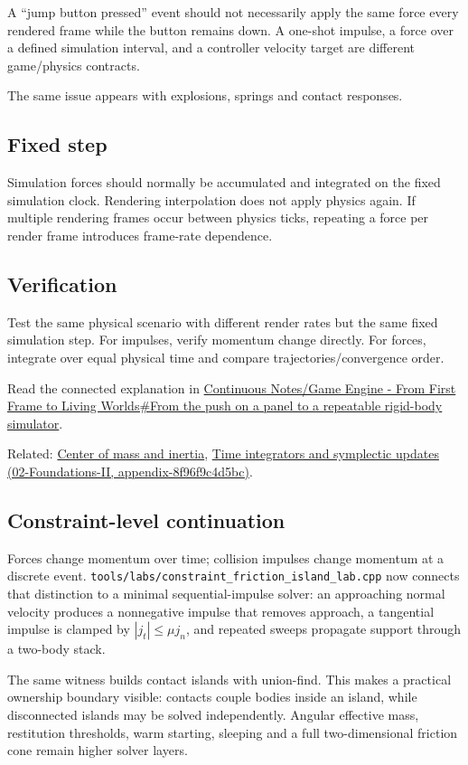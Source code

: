 A ``jump button pressed'' event should not necessarily apply the same force every rendered frame while the button remains down. A one-shot impulse, a force over a defined simulation interval, and a controller velocity target are different game/physics contracts.

The same issue appears with explosions, springs and contact responses.

\subsection{Fixed step}\label{fixed-step}

Simulation forces should normally be accumulated and integrated on the fixed simulation clock. Rendering interpolation does not apply physics again. If multiple rendering frames occur between physics ticks, repeating a force per render frame introduces frame-rate dependence.

\subsection{Verification}\label{verification}

Test the same physical scenario with different render rates but the same fixed simulation step. For impulses, verify momentum change directly. For forces, integrate over equal physical time and compare trajectories/convergence order.

Read the connected explanation in \href{Continuous\%20Notes/Game\%20Engine\%20-\%20From\%20First\%20Frame\%20to\%20Living\%20Worlds\#From\%20the\%20push\%20on\%20a\%20panel\%20to\%20a\%20repeatable\%20rigid-body\%20simulator}{Continuous Notes/Game Engine - From First Frame to Living Worlds\#From the push on a panel to a repeatable rigid-body simulator}.

Related: \hyperref[appendix-66742099f8a0]{Center of mass and inertia}, \href{}{Time integrators and symplectic updates (02-Foundations-II, appendix-8f96f9c4d5bc)}.

\subsection{Constraint-level continuation}\label{constraint-level-continuation}

Forces change momentum over time; collision impulses change momentum at a discrete event. \texttt{tools/labs/constraint\_friction\_island\_lab.cpp} now connects that distinction to a minimal sequential-impulse solver: an approaching normal velocity produces a nonnegative impulse that removes approach, a tangential impulse is clamped by \(|j_t|\le\mu j_n\), and repeated sweeps propagate support through a two-body stack.

The same witness builds contact islands with union-find. This makes a practical ownership boundary visible: contacts couple bodies inside an island, while disconnected islands may be solved independently. Angular effective mass, restitution thresholds, warm starting, sleeping and a full two-dimensional friction cone remain higher solver layers.
